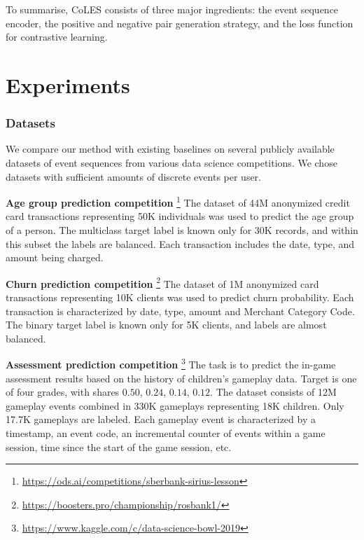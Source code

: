 \documentclass[sigconf]{acmart}
\begin{document}
\medskip
To summarise, CoLES consists of three major ingredients: the event sequence encoder, the positive
and negative pair generation strategy, and the loss function for contrastive learning.


\section{Experiments} \label{sec-exp}

\subsubsection{Datasets}

We compare our method with existing baselines on several publicly available datasets of
event sequences from various data science competitions. We chose datasets with sufficient
amounts of discrete events per user.

\textbf{Age group prediction competition}%
\footnote{
    \url{https://ods.ai/competitions/sberbank-sirius-lesson}
}
The dataset of 44M an\-onymiz\-ed credit card transactions representing 50K individuals
was used to predict the age group of a person. The multiclass target label is known only for 30K records,
and within this subset the labels are balanced. Each transaction includes the date, type,
and amount being charged.


\textbf{Churn prediction competition}%
\footnote{
    \url{https://boosters.pro/championship/rosbank1/}
}
The dataset of 1M an\-onymiz\-ed card transactions representing 10K clients was used to
predict churn probability. Each transaction is characterized by date, type, amount and
Merchant Category Code. The binary target label is known only for 5K clients, and labels
are almost balanced.

\textbf{Assessment prediction competition}%
\footnote{
    \url{https://www.kaggle.com/c/data-science-bowl-2019}
}
The task is to predict the in-game assessment results based on the history of children's
gameplay data. Target is one of four grades, with shares $0.50$, $0.24$, $0.14$, $0.12$.
The dataset consists of 12M gameplay events combined in 330K gameplays representing 18K
children. Only 17.7K gameplays are labeled.
Each gameplay event is characterized by a timestamp, an event code, an incremental counter
of events within a game session, time since the start of the game session, etc.
\end{document}
